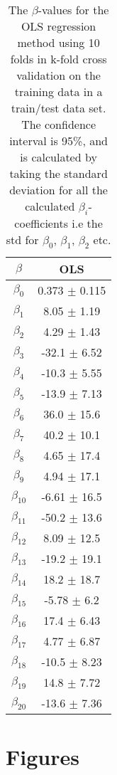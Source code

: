 \documentclass[uio,jmp,amsmath,amssymb,reprint,nofootinbib]{revtex4-1}
\numberwithin{equation}{section}
\begin{document}
\begin{table}
\begin{tabular}{|c|c|}\hline
\(\beta\) & OLS \\ \hline
\(\beta_{0}\) & 0.373 \(\pm\) 0.115 \\ \hline
\(\beta_{1}\) & 8.05 \(\pm\) 1.19 \\ \hline
\(\beta_{2}\) & 4.29 \(\pm\) 1.43 \\ \hline
\(\beta_{3}\) & -32.1 \(\pm\) 6.52 \\ \hline
\(\beta_{4}\) & -10.3 \(\pm\) 5.55 \\ \hline
\(\beta_{5}\) & -13.9 \(\pm\) 7.13 \\ \hline
\(\beta_{6}\) & 36.0 \(\pm\) 15.6 \\ \hline
\(\beta_{7}\) & 40.2 \(\pm\) 10.1 \\ \hline
\(\beta_{8}\) & 4.65 \(\pm\) 17.4 \\ \hline
\(\beta_{9}\) & 4.94 \(\pm\) 17.1 \\ \hline
\(\beta_{10}\) & -6.61 \(\pm\) 16.5 \\ \hline
\(\beta_{11}\) & -50.2 \(\pm\) 13.6 \\ \hline
\(\beta_{12}\) & 8.09 \(\pm\) 12.5 \\ \hline
\(\beta_{13}\) & -19.2 \(\pm\) 19.1 \\ \hline
\(\beta_{14}\) & 18.2 \(\pm\) 18.7 \\ \hline
\(\beta_{15}\) & -5.78 \(\pm\) 6.2 \\ \hline
\(\beta_{16}\) & 17.4 \(\pm\) 6.43 \\ \hline
\(\beta_{17}\) & 4.77 \(\pm\) 6.87 \\ \hline
\(\beta_{18}\) & -10.5 \(\pm\) 8.23 \\ \hline
\(\beta_{19}\) & 14.8 \(\pm\) 7.72 \\ \hline
\(\beta_{20}\) & -13.6 \(\pm\) 7.36 \\ \hline
\end{tabular}
\caption{The \(\beta\)-values for the OLS regression method using 10 folds in k-fold cross validation on the training data in a train/test data set. The confidence interval is 95\%, and is calculated by taking the standard deviation for all the calculated \(\beta_i\)-coefficients i.e the std for \(\beta_0\), \(\beta_1\), \(\beta_2\) etc.}
\label{tab:14}
\end{table}

\FloatBarrier

\section{Figures}
\end{document}
